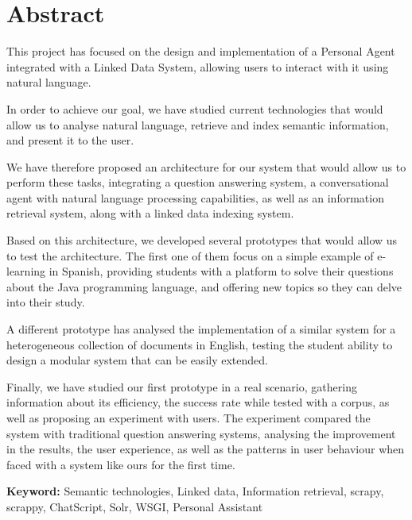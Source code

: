 \cleardoublepage
{}
\chapter*{Abstract}

This project has focused on the design and implementation of a Personal Agent integrated with a Linked Data System, allowing users to interact with it using natural language.

In order to achieve our goal, we have studied current technologies that would allow us to analyse natural language, retrieve and index semantic information, and present it to the user.

We have therefore proposed an architecture for our system that would allow us to perform these tasks, integrating a question answering system, a conversational agent with natural language processing capabilities, as well as an information retrieval system, along with a linked data indexing system.

Based on this architecture, we developed several prototypes that would allow us to test the architecture. The first one of them focus on a simple example of e-learning in Spanish, providing students with a platform to solve their questions about the Java programming language, and offering new topics so they can delve into their study.

A different prototype has analysed the implementation of a similar system for a heterogeneous collection of documents in English, testing the student ability to design a modular system that can be easily extended.

Finally, we have studied our first prototype in a real scenario, gathering information about its efficiency, the success rate while tested with a corpus, as well as proposing an experiment with users. The experiment compared the system with traditional question answering systems, analysing the improvement in the results, the user experience, as well as the patterns in user behaviour when faced with a system like ours for the first time.

\vfill
\textbf{Keyword:} Semantic technologies, Linked data, Information retrieval, scrapy, scrappy, ChatScript, Solr, WSGI, Personal Assistant